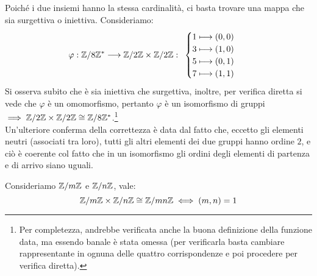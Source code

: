 \documentclass[11pt]{scrartcl}
\begin{document}
\begin{soln}
Poiché i due insiemi hanno la stessa cardinalità, ci basta trovare una mappa che sia surgettiva o iniettiva. Consideriamo:
	\[ 	\varphi : \mathbb Z/8\mathbb Z^* \longrightarrow \mathbb Z/2\mathbb Z \times \mathbb Z/2\mathbb Z :
		\begin{array}{cccc}
		\begin{cases}
		1 \longmapsto (0,0) \\
		3 \longmapsto (1,0) \\
		5 \longmapsto (0,1) \\
		7 \longmapsto (1,1) \\
		\end{cases}
		\end{array}
	\]
Si osserva subito che è sia iniettiva che surgettiva, inoltre, per verifica diretta si vede che $\varphi$ è un omomorfismo, pertanto $\varphi$ è un isomorfismo di gruppi $\implies \mathbb Z/2\mathbb Z \times \mathbb Z/2\mathbb Z \cong \mathbb Z/8\mathbb Z^*$.\footnote{Per completezza, andrebbe verificata anche la buona definizione della funzione data, ma essendo banale è stata omessa (per verificarla basta cambiare rappresentante in ognuna delle quattro corrispondenze e poi procedere per verifica diretta).} \\
Un'ulteriore conferma della correttezza è data dal fatto che, eccetto gli elementi neutri (associati tra loro), tutti gli altri elementi dei due gruppi hanno ordine $2$, e ciò è coerente col fatto che in un isomorfismo gli ordini degli elementi di partenza e di arrivo siano uguali.
\end{soln}

\begin{theorem}
\label{g:crt_3}
Consideriamo ${\mathbb Z}/m{\mathbb Z}$ e ${\mathbb Z}/n{\mathbb Z}$, vale:
	\[ {\mathbb Z}/m{\mathbb Z} \times {\mathbb Z}/n{\mathbb Z}
	\cong
	\mathbb Z/mn\mathbb Z
	\iff
	(m,n)=1
	\]
\end{theorem}
\end{document}
